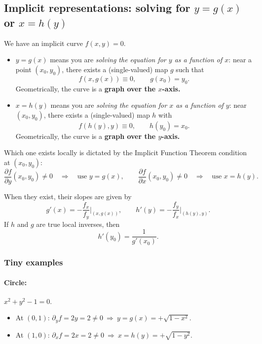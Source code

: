 \documentclass[12pt,a4paper]{article}
\theoremstyle{plain}
\theoremstyle{definition}
\theoremstyle{remark}
\theoremstyle{remark}
\begin{document}
	\subsection*{Implicit representations: solving for $y=g(x)$ or $x=h(y)$}
	
	We have an implicit curve $f(x,y)=0$.
	
	\begin{itemize}
		\item $y=g(x)$ means you are \emph{solving the equation for $y$ as a function of $x$}:
		near a point $(x_0,y_0)$, there exists a (single-valued) map $g$ such that
		\[
		f(x,g(x)) \equiv 0, \qquad g(x_0)=y_0.
		\]
		Geometrically, the curve is a \textbf{graph over the $x$-axis.}
		
		\item $x=h(y)$ means you are \emph{solving the equation for $x$ as a function of $y$}:
		near $(x_0,y_0)$, there exists a (single-valued) map $h$ with
		\[
		f(h(y),y) \equiv 0, \qquad h(y_0)=x_0.
		\]
		Geometrically, the curve is a \textbf{graph over the $y$-axis.}
	\end{itemize}
	
	Which one exists locally is dictated by the Implicit Function Theorem condition at $(x_0,y_0)$:
	\[
	\frac{\partial f}{\partial y}(x_0,y_0)\neq 0 \quad\Rightarrow\quad \text{use } y=g(x),
	\qquad
	\frac{\partial f}{\partial x}(x_0,y_0)\neq 0 \quad\Rightarrow\quad \text{use } x=h(y).
	\]
	
	When they exist, their slopes are given by
	\[
	g'(x) = -\frac{f_x}{f_y}\Big|_{(x,g(x))}, 
	\qquad
	h'(y) = -\frac{f_y}{f_x}\Big|_{(h(y),y)}.
	\]
	If $h$ and $g$ are true local inverses, then 
	\[
	h'(y_0)=\frac{1}{g'(x_0)}.
	\]
	
	\subsubsection*{Tiny examples}
	
	\paragraph{Circle:} $x^2 + y^2 - 1 = 0.$
	\begin{itemize}
		\item At $(0,1)$: $\partial_y f = 2y = 2 \neq 0 \ \Rightarrow\ y = g(x) = +\sqrt{1 - x^2}.$
		\item At $(1,0)$: $\partial_x f = 2x = 2 \neq 0 \ \Rightarrow\ x = h(y) = +\sqrt{1 - y^2}.$
	\end{itemize}
	
\end{document}
